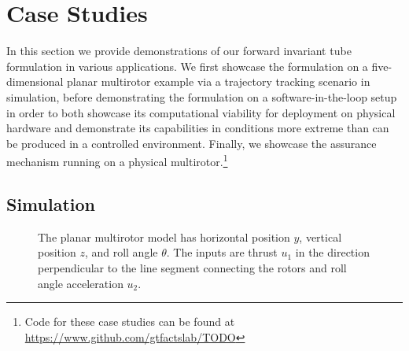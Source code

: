 \documentclass{IEEEojcsys}
\newtheorem{theorem}{Theorem}
\begin{document}


\section{Case Studies}
\label{section:sim}
In this section we provide demonstrations of our forward invariant tube formulation in various applications. We first showcase the formulation on a five-dimensional planar multirotor example via a trajectory tracking scenario in simulation, before demonstrating the formulation on a software-in-the-loop setup in order to both showcase its computational viability for deployment on physical hardware and demonstrate its capabilities in conditions more extreme than can be produced in a controlled environment. Finally, we showcase the assurance mechanism running on a physical multirotor.\footnote{Code for these case studies can be found at \url{https://www.github.com/gtfactslab/TODO}}

\subsection{Simulation}
\begin{figure}[t!]
\centering
  
  \caption{The planar multirotor model has horizontal position $y$, vertical position $z$, and roll angle $\theta$. The inputs are thrust $u_1$ in the direction perpendicular to the line segment connecting the rotors and roll angle acceleration $u_2$.}
  \label{fig:quad}
\end{figure}
\end{document}
